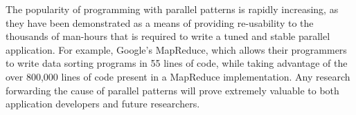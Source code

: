 

The popularity of programming with parallel patterns is rapidly
increasing, as they have been demonstrated as a means of providing
re-usability to the thousands of man-hours that is required to write a
tuned and stable parallel application. For example, Google's
MapReduce, which allows their programmers to write data sorting
programs in 55 lines of code, while taking advantage of the over
800,000 lines of code present in a MapReduce implementation. Any
research forwarding the cause of parallel patterns will prove
extremely valuable to both application developers and future
researchers.


